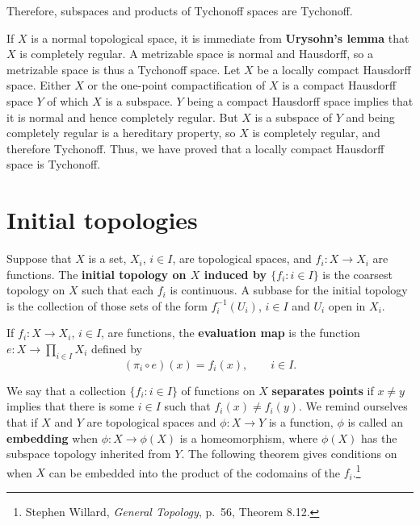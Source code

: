 \documentclass{article}
\theoremstyle{definition}
\begin{document}
Therefore, subspaces and products of Tychonoff spaces are Tychonoff.

If $X$ is a normal topological space, it is immediate from \textbf{Urysohn's lemma} that $X$ is completely regular. A metrizable
space is normal and Hausdorff, so a metrizable space is thus a Tychonoff space. 
Let $X$ be a locally compact Hausdorff space. Either $X$ or the one-point compactification of $X$ is a compact Hausdorff space $Y$ of which $X$ is a subspace.
$Y$ being a compact Hausdorff space implies that it is normal and hence completely
regular. But $X$ is a subspace of $Y$ and being completely regular is a hereditary property, so
$X$ is completely regular, and therefore Tychonoff. Thus, we have proved that a locally compact Hausdorff space is Tychonoff. 



\section{Initial topologies}
Suppose that $X$ is a set, $X_i$, $i \in I$, are topological spaces, and 
$f_i:X \to X_i$ are functions. The \textbf{initial topology on $X$ induced by
$\{f_i: i \in I\}$} is the coarsest topology on $X$ such that each $f_i$ is continuous.
A subbase for the initial topology is the collection of those sets of the form
$f_i^{-1}(U_i)$, $i \in I$ and $U_i$ open in $X_i$.  

If $f_i:X \to X_i$, $i \in I$, are functions, the \textbf{evaluation map}
is the function
$e:X \to \prod_{i \in I} X_i$ defined by
\[
(\pi_i \circ e)(x) = f_i(x), \qquad i \in I.
\] 

We say that a  collection $\{f_i:i \in I\}$ of functions on $X$  \textbf{separates points} if
$x \neq y$ implies that there is some $i \in I$ such that $f_i(x) \neq f_i(y)$.
We remind ourselves that if $X$ and $Y$ are topological spaces and $\phi:X \to Y$ is a function, $\phi$ is called an
\textbf{embedding} when $\phi:X \to \phi(X)$ is a homeomorphism, where $\phi(X)$ has the subspace topology inherited from $Y$.
The following theorem
gives conditions on when $X$ can be embedded into the product of the codomains
of the $f_i$.\footnote{Stephen Willard, {\em General Topology}, p.~56, Theorem 8.12.} 
\end{document}
